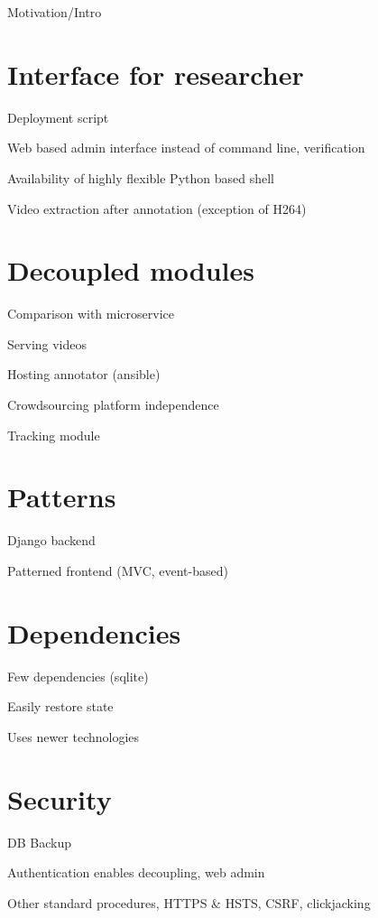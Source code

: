
Motivation/Intro

\section{Interface for researcher}

Deployment script

Web based admin interface instead of command line, verification

Availability of highly flexible Python based shell

Video extraction after annotation (exception of H264)

\section{Decoupled modules}

Comparison with microservice

Serving videos

Hosting annotator (ansible)

Crowdsourcing platform independence

Tracking module

\section{Patterns}

Django backend

Patterned frontend (MVC, event-based)

\section{Dependencies}

Few dependencies (sqlite)

Easily restore state

Uses newer technologies

\section{Security}

DB Backup

Authentication enables decoupling, web admin

Other standard procedures, HTTPS \& HSTS, CSRF, clickjacking


